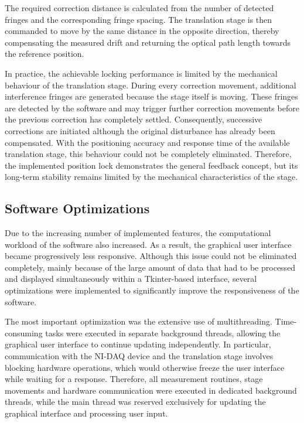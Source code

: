 The required correction distance is calculated from the number of detected fringes and the corresponding fringe spacing. The translation stage is then commanded to move by the same distance in the opposite direction, thereby compensating the measured drift and returning the optical path length towards the reference position.

In practice, the achievable locking performance is limited by the mechanical behaviour of the translation stage. During every correction movement, additional interference fringes are generated because the stage itself is moving. These fringes are detected by the software and may trigger further correction movements before the previous correction has completely settled. Consequently, successive corrections are initiated although the original disturbance has already been compensated. With the positioning accuracy and response time of the available translation stage, this behaviour could not be completely eliminated. Therefore, the implemented position lock demonstrates the general feedback concept, but its long-term stability remains limited by the mechanical characteristics of the stage.

\subsection{Software Optimizations}

Due to the increasing number of implemented features, the computational workload of the software also increased. As a result, the graphical user interface became progressively less responsive. Although this issue could not be eliminated completely, mainly because of the large amount of data that had to be processed and displayed simultaneously within a Tkinter-based interface, several optimizations were implemented to significantly improve the responsiveness of the software.

The most important optimization was the extensive use of multithreading. Time-consuming tasks were executed in separate background threads, allowing the graphical user interface to continue updating independently. In particular, communication with the NI-DAQ device and the translation stage involves blocking hardware operations, which would otherwise freeze the user interface while waiting for a response. Therefore, all measurement routines, stage movements and hardware communication were executed in dedicated background threads, while the main thread was reserved exclusively for updating the graphical interface and processing user input.

